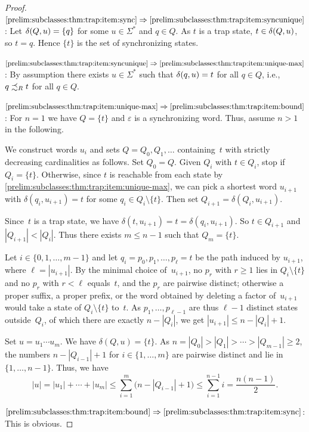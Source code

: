 \begin{proof}
	$\ref{prelim:subclasses:thm:trap:item:sync} \Rightarrow
\ref{prelim:subclasses:thm:trap:item:syncunique}$:
Let $\delta(Q,u) = \{q\}$ for some $u \in \Sigma^*$ and
$q \in Q$. As $t$ is a trap state, $t \in \delta(Q,u)$, so
$t = q$. Hence $\{t\}$ is the set of synchronizing states.
	
	$\ref{prelim:subclasses:thm:trap:item:syncunique} \Rightarrow \ref{prelim:subclasses:thm:trap:item:unique-max}$: By assumption there exists $u \in \Sigma^*$ 
	such that $\delta(q,u) = t$ for all $q \in Q$, i.e., $q \precsim_R t$
	for all $q \in Q$.	
	
	$\ref{prelim:subclasses:thm:trap:item:unique-max} \Rightarrow \ref{prelim:subclasses:thm:trap:item:bound}$: 	
	For $n = 1$ we have $Q = \{t\}$ and $\varepsilon$ is a synchronizing word.
	Thus, assume $n > 1$ in the following.
	
	We construct words $u_i$ and sets $Q = Q_0, Q_1, \ldots$
	containing~$t$ with strictly decreasing cardinalities as follows. Set $Q_0 = Q$.
	Given $Q_i$ with $t \in Q_i$, stop if $Q_i = \{t\}$.
	Otherwise, since $t$ is reachable from each state by \cref{prelim:subclasses:thm:trap:item:unique-max},
	we can pick a shortest word $u_{i+1}$ with $\delta(q_i, u_{i+1}) = t$
	for some $q_i \in Q_i \setminus \{t\}$. Then set $Q_{i+1} = \delta(Q_i, u_{i+1})$.
	
	Since~$t$ is a trap state, we have $\delta(t, u_{i+1}) = t = \delta(q_i, u_{i+1})$.
	So $t \in Q_{i+1}$ and $|Q_{i+1}| < |Q_i|$.
	Thus there exists $m \le n - 1$ such that $Q_m = \{t\}$.
	
	Let $i \in \{0,1,\ldots,m-1\}$ and 
	let $q_i = p_0, p_1, \ldots, p_\ell = t$ be the path induced by $u_{i+1}$,
	where $\ell = |u_{i+1}|$. By the minimal choice of~$u_{i+1}$, no $p_r$ with
	$r \ge 1$ lies in $Q_i \setminus \{t\}$ and no $p_r$ with $r < \ell$
	equals~$t$, and the $p_r$ are pairwise distinct; otherwise a proper suffix,
	a proper prefix, or the word obtained by deleting a factor of~$u_{i+1}$
	would take a state of $Q_i \setminus \{t\}$ to~$t$. As
	$p_1, \ldots, p_{\ell-1}$ are thus $\ell - 1$ distinct states outside~$Q_i$,
	of which there are exactly $n - |Q_i|$, we get
	$|u_{i+1}| \le n - |Q_i| + 1$.
	
	Set $u = u_1 \cdots u_m$. We have $\delta(Q, u) = \{t\}$.
	As $n = |Q_0| > |Q_1| > \cdots > |Q_{m-1}| \ge 2$, the numbers
	$n - |Q_{i-1}| + 1$ for $i \in \{1, \ldots, m\}$ are pairwise distinct and
	lie in $\{1, \ldots, n-1\}$.
	Thus, we have	
	\[
	|u| = |u_1| + \cdots + |u_m| \le \sum_{i=1}^m \bigl( n - |Q_{i-1}| + 1 \bigr)
	\le \sum_{i=1}^{n-1} i = \frac{n(n-1)}{2}.
	\]
	
		
	$\ref{prelim:subclasses:thm:trap:item:bound} \Rightarrow \ref{prelim:subclasses:thm:trap:item:sync}$: This is obvious.
\end{proof}

